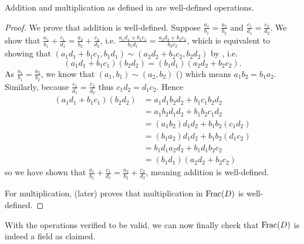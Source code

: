 \begin{proposition}
    Addition and multiplication as defined in  are well-defined operations.
\end{proposition}
\begin{proof}
    We prove that addition is well-defined. Suppose $\frac{a_1}{b_1} = \frac{a_2}{b_2}$ and $\frac{c_1}{d_1} = \frac{c_2}{d_2}$. We show that $\frac{a_1}{b_1} + \frac{c_1}{d_1} = \frac{a_2}{b_2} + \frac{c_2}{d_2}$, i.e. $\frac{a_1d_1+b_1c_1}{b_1d_1} = \frac{a_2d_2 + b_2c_2}{b_2c_2}$, which is equivalent to showing that $(a_1d_1+b_1c_1, b_1d_1) \mathrel{\sim} (a_2d_2+b_2c_2, b_2d_2)$ by , i.e.
    \[
        (a_1d_1+b_1c_1)(b_2d_2) = (b_1d_1)(a_2d_2+b_2c_2).
    \]
    As $\frac{a_1}{b_1} = \frac{a_2}{b_2}$, we know that $(a_1, b_1) \mathrel{\sim} (a_2, b_2)$ () which means $a_1b_2 = b_1a_2$. Similarly, because $\frac{c_1}{d_1} = \frac{c_2}{d_2}$ thus $c_1d_2 = d_1c_2$. Hence
    \begin{align*}
        (a_1d_1+b_1c_1)(b_2d_2) &= a_1d_1b_2d_2 + b_1c_1b_2d_2\\
        &= a_1b_2d_1d_2 + b_1b_2c_1d_2\\
        &= (a_1b_2)d_1d_2 + b_1b_2(c_1d_2)\\
        &= (b_1a_2)d_1d_2 + b_1b_2(d_1c_2)\\
        &= b_1d_1a_2d_2 + b_1d_1b_2c_2\\
        &= (b_1d_1)(a_2d_2 + b_2c_2)
    \end{align*}
    so we have shown that $\frac{a_1}{b_1} + \frac{c_1}{d_1} = \frac{a_2}{b_2} + \frac{c_2}{d_2}$, meaning addition is well-defined.

    For multiplication,  (later) proves that multiplication in $\mathrm{Frac}(D)$ is well-defined.
\end{proof}

With the operations verified to be valid, we can now finally check that $\mathrm{Frac}(D)$ is indeed a field as claimed.

